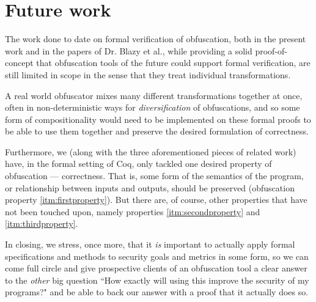 \documentclass[compsoc,conference,a4paper,10pt,times]{IEEEtran}
\begin{document}
\section{Future work}
The work done to date on formal verification of obfuscation, both in the present work and in the papers of Dr. Blazy et al., while providing a solid proof-of-concept that obfuscation tools of the future could support formal verification, are still limited in scope in the sense that they treat individual transformations.
\par A real world obfuscator mixes many different transformations together at once, often in non-deterministic ways for \emph{diversification} of obfuscations, and so some form of compositionality would need to be implemented on these formal proofs to be able to use them together and preserve the desired formulation of correctness. 
\par Furthermore, we (along with the three aforementioned pieces of related work) have, in the formal setting of Coq, only tackled one desired property of obfuscation --- correctness.  That is, some form of the semantics of the program, or relationship between inputs and outputs, should be preserved (obfuscation property \ref{itm:firstproperty}). But there are, of course, other properties that have not been touched upon, namely properties \ref{itm:secondproperty} and \ref{itm:thirdproperty}.
\par In closing, we stress, once more, that it \emph{is} important to actually apply formal specifications and methods to security goals and metrics in some form, so we can come full circle and give prospective clients of an obfuscation tool a clear answer to the \emph{other} big question ``How exactly will using this improve the security of my programs?" and be able to back our answer with a proof that it actually does so.
\end{document}
